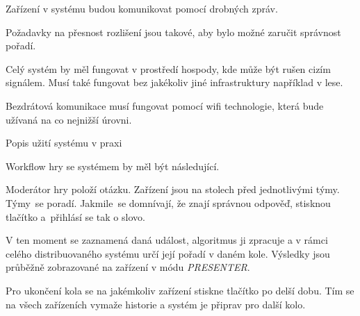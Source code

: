 Zařízení v systému budou komunikovat pomocí drobných zpráv.

Požadavky na přesnost rozlišení jsou takové, aby bylo možné zaručit správnost pořadí.

Celý systém by měl fungovat v prostředí hospody, kde může být rušen cizím signálem. Musí také fungovat bez jakékoliv jiné infrastruktury například v lese.

Bezdrátová komunikace musí fungovat pomocí wifi technologie, která bude užívaná na co nejnižší úrovni.

\sec Popis užití systému v praxi

Workflow hry se systémem by měl být následující.

Moderátor hry položí otázku. Zařízení jsou na stolech před jednotlivými týmy. Týmy~se poradí. Jakmile~se domnívají, že znají správnou odpověď, stisknou tlačítko a~přihlásí se tak o slovo.

V ten moment se zaznamená daná událost, algoritmus ji zpracuje a v rámci celého distribuovaného systému určí její pořadí v daném kole. Výsledky jsou průběžně zobrazované na zařízení v módu {\em PRESENTER}.

Pro ukončení kola se na jakémkoliv zařízení stiskne tlačítko po delší dobu. Tím se na všech zařízeních vymaže historie a systém je připrav pro další kolo.

